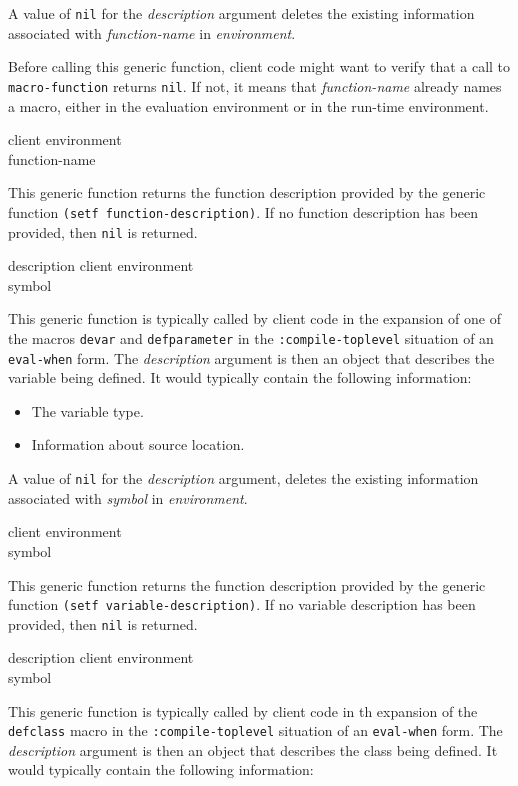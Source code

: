 A value of \texttt{nil} for the \textit{description} argument deletes
the existing information associated with \textit{function-name} in
\textit{environment}.

Before calling this generic function, client code might want to verify
that a call to \texttt{macro-function} returns \texttt{nil}.  If not,
it means that \textit{function-name} already names a macro, either in
the evaluation environment or in the run-time environment.

 {client environment \\ function-name}

This generic function returns the function description provided by the
generic function \texttt{(setf function-description)}.  If no function
description has been provided, then \texttt{nil} is returned.

{\small{} {description client environment \\
symbol}
}

This generic function is typically called by client code in the
expansion of one of the macros \texttt{devar} and
\texttt{defparameter} in the \texttt{:compile-toplevel} situation of an
\texttt{eval-when} form.  The \textit{description} argument is then an
object that describes the variable being defined.  It would typically
contain the following information:

\begin{itemize}
\item The variable type.
\item Information about source location.
\end{itemize}

A value of \texttt{nil} for the \textit{description} argument, deletes
the existing information associated with \textit{symbol} in
\textit{environment}.

 {client environment \\ symbol}

This generic function returns the function description provided by the
generic function \texttt{(setf variable-description)}.  If no variable
description has been provided, then \texttt{nil} is returned.

{\small{} {description client environment \\
symbol}
}

This generic function is typically called by client code in th
expansion of the \texttt{defclass} macro in the
\texttt{:compile-toplevel} situation of an \texttt{eval-when} form.
The \textit{description} argument is then an object that describes the
class being defined.  It would typically contain the following
information:

